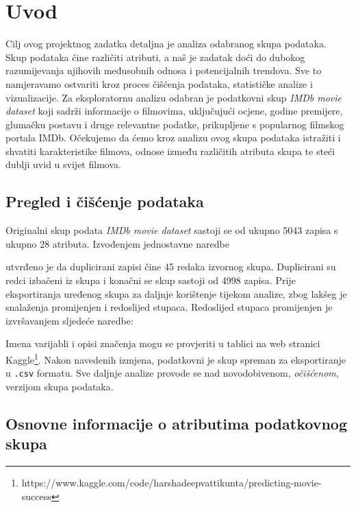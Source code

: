 

\chapter{Uvod}

	 Cilj ovog projektnog zadatka detaljna je analiza odabranog skupa podataka. Skup podataka čine različiti atributi, a naš je zadatak doći do dubokog razumijevanja njihovih međusobnih odnosa i potencijalnih trendova. Sve to namjeravamo ostvariti kroz proces čišćenja podataka, statističke analize i vizualizacije. Za eksploratornu analizu odabran je podatkovni skup \textit{IMDb movie dataset} koji sadrži informacije o filmovima, uključujući ocjene, godine premijere, glumačku postavu i druge relevantne podatke, prikupljene s popularnog filmskog portala IMDb. Očekujemo da ćemo kroz analizu ovog skupa podataka istražiti i shvatiti karakteristike filmova, odnose između različitih atributa skupa te steći dublji uvid u svijet filmova.
	 
	 \section{Pregled i čišćenje podataka}
	 
	 Originalni skup podata \textit{IMDb movie dataset} sastoji se od ukupno 5043 zapisa s ukupno 28 atributa. Izvođenjem jednostavne naredbe 
	 
	 
	 
	 \noindent utvrđeno je da duplicirani zapisi čine 45 redaka izvornog skupa. Duplicirani su redci izbačeni iz skupa i konačni se skup sastoji od 4998 zapisa. Prije eksportiranja uređenog skupa za daljnje korištenje tijekom analize, zbog lakšeg je snalaženja promijenjen i redoslijed stupaca. Redoslijed stupaca promijenjen je izvršavanjem sljedeće naredbe: 
	 
	 
	 
	 \noindent Imena varijabli i opisi značenja mogu se provjeriti u tablici na web stranici Kaggle\footnote{https://www.kaggle.com/code/harshadeepvattikunta/predicting-movie-success}. Nakon navedenih izmjena, podatkovni je skup spreman za eksportiranje u \texttt{.csv} formatu. Sve daljnje analize provode se nad novodobivenom, \textit{očišćenom}, verzijom skupa podataka.  
	 
	 \section[Osnovne informacije o atributima podatkovnog skupa]{Osnovne informacije o atributima podatkovnog \\ skupa}
	 
